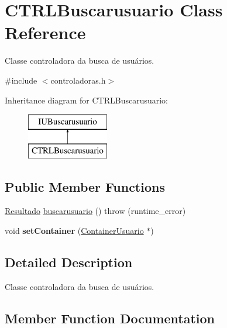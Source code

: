 \hypertarget{classCTRLBuscarusuario}{}\section{C\+T\+R\+L\+Buscarusuario Class Reference}
\label{classCTRLBuscarusuario}


Classe controladora da busca de usuários.  




{\ttfamily \#include $<$controladoras.\+h$>$}

Inheritance diagram for C\+T\+R\+L\+Buscarusuario\+:\begin{figure}[H]
\begin{center}
\leavevmode
\includegraphics[height=2.000000cm]{classCTRLBuscarusuario}
\end{center}
\end{figure}
\subsection*{Public Member Functions}
\begin{DoxyCompactItemize}
\item 
\hyperlink{classResultado}{Resultado} \hyperlink{classCTRLBuscarusuario_a4c73f22cb6b0083a99a21e3abe45cc5a}{buscarusuario} ()  throw (runtime\+\_\+error)
\item 
\mbox{\label{classCTRLBuscarusuario_a6c3e0654e911ab67bc3e40f84b93abba}} 
void {\bfseries set\+Container} (\hyperlink{classContainerUsuario}{Container\+Usuario} $\ast$)
\end{DoxyCompactItemize}


\subsection{Detailed Description}
Classe controladora da busca de usuários. 

\subsection{Member Function Documentation}
\mbox{\label{classCTRLBuscarusuario_a4c73f22cb6b0083a99a21e3abe45cc5a}} 
